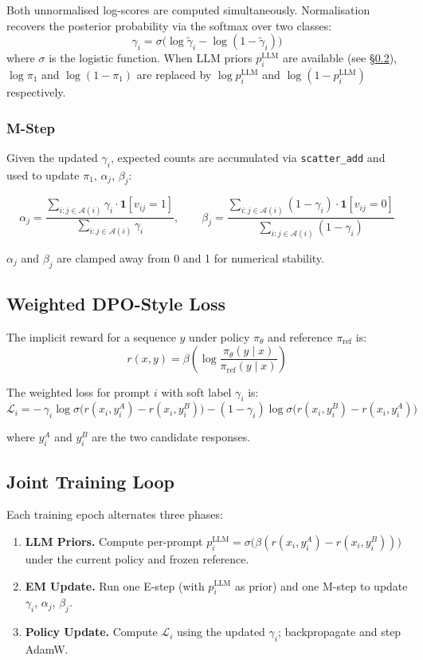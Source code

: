 \documentclass[11pt, a4paper]{article}
\begin{document}
Both unnormalised log-scores are computed simultaneously. Normalisation recovers the
posterior probability via the softmax over two classes:
\[
  \gamma_i = \sigma\!\bigl(\log\tilde{\gamma}_i - \log(1-\tilde{\gamma}_i)\bigr)
\]
where $\sigma$ is the logistic function. When LLM priors $p_i^\text{LLM}$ are available
(see \S\ref{sec:joint}), $\log\pi_1$ and $\log(1-\pi_1)$ are replaced by
$\log p_i^\text{LLM}$ and $\log(1-p_i^\text{LLM})$ respectively.

\subsubsection{M-Step}

Given the updated $\gamma_i$, expected counts are accumulated via \texttt{scatter\_add}
and used to update $\pi_1$, $\alpha_j$, $\beta_j$:

\[
  \alpha_j = \frac{\sum_{i: j\in\mathcal{A}(i)} \gamma_i \cdot \mathbf{1}[v_{ij}=1]}
                  {\sum_{i: j\in\mathcal{A}(i)} \gamma_i}, \qquad
  \beta_j  = \frac{\sum_{i: j\in\mathcal{A}(i)} (1-\gamma_i) \cdot \mathbf{1}[v_{ij}=0]}
                  {\sum_{i: j\in\mathcal{A}(i)} (1-\gamma_i)}
\]

$\alpha_j$ and $\beta_j$ are clamped away from 0 and 1 for numerical stability.

\subsection{Weighted DPO-Style Loss}

The implicit reward for a sequence $y$ under policy $\pi_\theta$ and reference $\pi_\text{ref}$ is:
\[
  r(x, y) = \beta \left(\log\frac{\pi_\theta(y\mid x)}{\pi_\text{ref}(y\mid x)}\right)
\]

The weighted loss for prompt $i$ with soft label $\gamma_i$ is:
\[
  \mathcal{L}_i = -\,\gamma_i \log\sigma\!\bigl(r(x_i, y_i^A) - r(x_i, y_i^B)\bigr)
                 -(1-\gamma_i)\log\sigma\!\bigl(r(x_i, y_i^B) - r(x_i, y_i^A)\bigr)
\]

where $y_i^A$ and $y_i^B$ are the two candidate responses.

\subsection{Joint Training Loop}
\label{sec:joint}

Each training epoch alternates three phases:

\begin{enumerate}[noitemsep]
  \item \textbf{LLM Priors.} Compute per-prompt
        $p_i^\text{LLM} = \sigma\!\bigl(\beta(r(x_i,y_i^A)-r(x_i,y_i^B))\bigr)$
        under the current policy and frozen reference.
  \item \textbf{EM Update.} Run one E-step (with $p_i^\text{LLM}$ as prior) and one
        M-step to update $\gamma_i$, $\alpha_j$, $\beta_j$.
  \item \textbf{Policy Update.} Compute $\mathcal{L}_i$ using the updated $\gamma_i$;
        backpropagate and step AdamW.
\end{enumerate}
\end{document}
